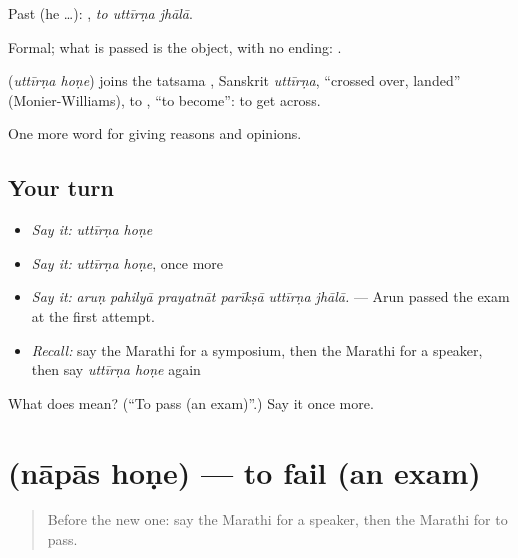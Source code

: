 Past (he …):   , \emph{to uttīrṇa jhālā}.

Formal; what is passed is the object, with no ending:   .

\begin{cousinweb}
\textbf{ } (\emph{uttīrṇa hoṇe}) joins the tatsama , Sanskrit \emph{uttīrṇa}, \textquotedblleft{}crossed over, landed\textquotedblright{} (Monier-Williams), to , \textquotedblleft{}to become\textquotedblright{}: to get across.
\end{cousinweb}

\begin{grammarlens}[title={What you've built}]
One more word for giving reasons and opinions.
\end{grammarlens}

\subsection*{Your turn}
\begin{itemize}
\raggedright
  \item \emph{Say it:} \emph{uttīrṇa hoṇe}
  \item \emph{Say it:} \emph{uttīrṇa hoṇe}, once more
  \item \emph{Say it:} \emph{aruṇ pahilyā prayatnāt parīkṣā uttīrṇa jhālā.} — Arun passed the exam at the first attempt.
  \item \emph{Recall:} say the Marathi for a symposium, then the Marathi for a speaker, then say \emph{uttīrṇa hoṇe} again
\end{itemize}

\begin{tcolorbox}[breakable,colback=teal!4,colframe=teal!35!black,title={Before you move on}]
What does   mean? (\textquotedblleft{}To pass (an exam)\textquotedblright{}.) Say it once more.
\end{tcolorbox}
\section[\texorpdfstring{\mr{नापास} \mr{होणे} (nāpās hoṇe)}{नापास होणे (nāpās hoṇe)}]{  (nāpās hoṇe) — to fail (an exam)}

\label{lesson:MR-C371-napas-hone}



\begin{quote}
Before the new one: say the Marathi for a speaker, then the Marathi for to pass.
\end{quote}

